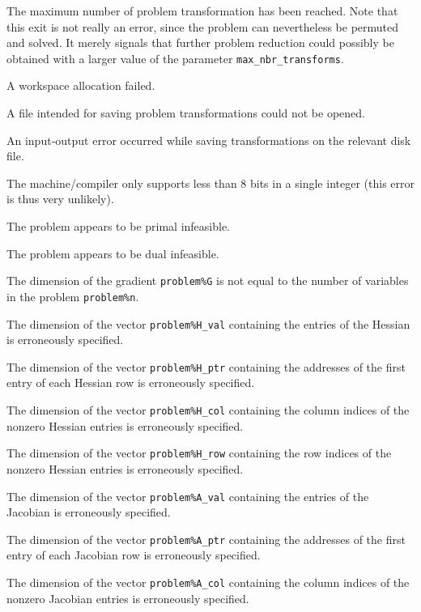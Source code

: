 \documentclass{galahad}
\begin{document}
\begin{description}

 The maximum number of problem transformation has been reached.
Note that this exit is not really an error, since the problem
can  nevertheless be permuted and  solved.  It merely
signals that further problem reduction could possibly
be obtained with a larger value of the parameter
{\tt max\_nbr\_transforms}.

 A workspace allocation failed.

 A file intended for saving problem transformations could not be
opened.

 An input-output error occurred while saving transformations on 
the relevant disk file.

 The machine/compiler only supports less than 8 bits in a
single integer (this error is thus very unlikely).

 The problem appears to be primal infeasible.

 The problem appears to be dual infeasible.

 The dimension of the gradient {\tt problem\%G} is not equal to
the number of variables in the problem {\tt problem\%n}.

 The dimension of the vector {\tt problem\%H\_val} containing the
entries of the Hessian is erroneously specified.

 The dimension of the vector {\tt problem\%H\_ptr} containing the
addresses of the first entry of each Hessian row is erroneously specified.

 The dimension of the vector {\tt problem\%H\_col} containing the
column  indices of the nonzero Hessian entries is erroneously specified.

 The dimension of the vector {\tt problem\%H\_row} containing the
row indices of the nonzero Hessian entries is erroneously specified.

 The dimension of the vector {\tt problem\%A\_val} containing the
entries of the Jacobian is erroneously specified.

 The dimension of the vector {\tt problem\%A\_ptr} containing the
addresses of the first entry of each Jacobian row is erroneously specified.

 The dimension of the vector {\tt problem\%A\_col} containing 
the column indices of the nonzero Jacobian entries is erroneously specified.


\end{description}
\end{document}
